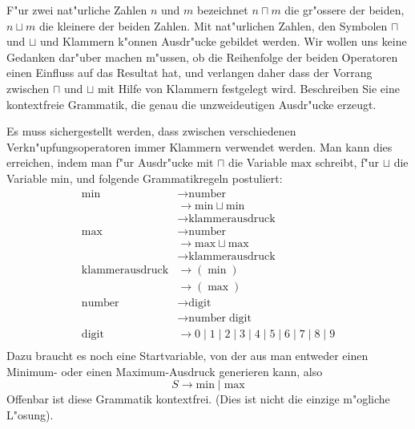 F"ur zwei nat"urliche Zahlen $n$ und $m$ bezeichnet $n\sqcap m$ die
gr"ossere der beiden, $n\sqcup m$ die kleinere der beiden Zahlen.
Mit nat"urlichen Zahlen, den Symbolen $\sqcap$ und $\sqcup$ und Klammern
k"onnen Ausdr"ucke gebildet werden.
Wir wollen uns keine Gedanken dar"uber machen m"ussen, ob die Reihenfolge
der beiden Operatoren einen Einfluss auf das Resultat hat, und
verlangen daher
dass der Vorrang zwischen $\sqcap$ und $\sqcup$ mit Hilfe
von Klammern festgelegt wird. Beschreiben Sie eine
kontextfreie Grammatik, die genau die unzweideutigen Ausdr"ucke
erzeugt.

\begin{loesung}
Es muss sichergestellt werden, dass zwischen verschiedenen
Verkn"upfungsoperatoren immer Klammern verwendet werden. Man kann
dies erreichen, indem man f"ur Ausdr"ucke mit $\sqcap$ die Variable
$\text{max}$ schreibt, f"ur $\sqcup$ die Variable $\text{min}$, und
folgende Grammatikregeln postuliert:
\begin{align*}
\text{min}&\rightarrow \text{number}\\
&\rightarrow \text{min}\sqcup \text{min}\\
&\rightarrow\text{klammerausdruck}\\
\text{max}&\rightarrow \text{number}\\
&\rightarrow \text{max}\sqcup \text{max}\\
&\rightarrow\text{klammerausdruck}\\
\text{klammerausdruck}&\rightarrow (\;\text{min}\;)\\
&\rightarrow (\;\text{max}\;)\\
\text{number}&\rightarrow\text{digit}\\
&\rightarrow\text{number}\;\text{digit}\\
\text{digit}&\rightarrow 0
\;|\;1
\;|\;2
\;|\;3
\;|\;4
\;|\;5
\;|\;6
\;|\;7
\;|\;8
\;|\;9
\\
\end{align*}
Dazu braucht es noch eine Startvariable, von der aus man entweder einen
Minimum- oder einen Maximum-Ausdruck generieren kann, also
$$S\rightarrow \text{min}\;|\;\text{max}$$
Offenbar ist diese Grammatik kontextfrei.
(Dies ist nicht die einzige m"ogliche L"osung).
\end{loesung}
